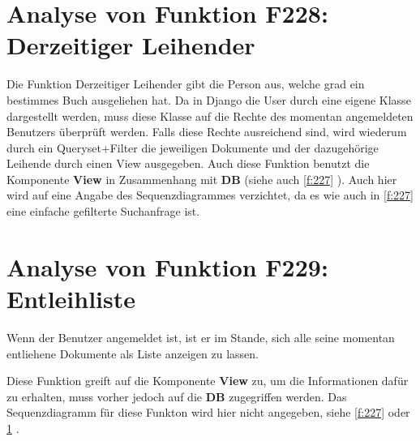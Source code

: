 \section{Analyse von Funktion F228: Derzeitiger Leihender}
\label{f:228}
Die Funktion Derzeitiger Leihender gibt die Person aus, welche grad ein bestimmes Buch ausgeliehen hat.
Da in Django die User durch eine eigene Klasse dargestellt werden, muss diese Klasse auf die Rechte des momentan angemeldeten Benutzers überprüft werden. Falls diese Rechte ausreichend sind, wird wiederum durch ein Queryset+Filter die jeweiligen Dokumente und der dazugehörige Leihende durch einen View ausgegeben.
Auch diese Funktion benutzt die Komponente \textbf{View} in Zusammenhang mit \textbf{DB} (siehe auch \ref{f:227} ).
Auch hier wird auf eine Angabe des Sequenzdiagrammes verzichtet, da es wie auch in \ref{f:227}  eine einfache gefilterte Suchanfrage ist.



\section{Analyse von Funktion F229: Entleihliste}
Wenn der Benutzer angemeldet ist, ist er im Stande, sich alle seine momentan entliehene Dokumente als Liste anzeigen zu lassen.

Diese Funktion greift auf die Komponente \textbf{View} zu, um die Informationen dafür zu erhalten, muss vorher jedoch auf die \textbf{DB} zugegriffen werden.
Das Sequenzdiagramm für diese Funkton wird hier nicht angegeben, siehe \ref{f:227}  oder \ref{f:228} .
